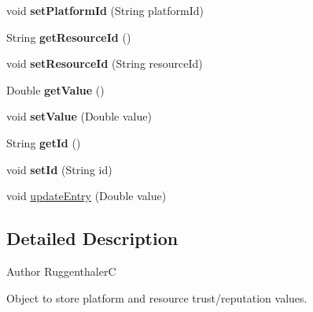 \begin{DoxyCompactItemize}
void {\bfseries set\+Platform\+Id} (String platform\+Id)
\item 
\mbox{\label{classeu_1_1h2020_1_1symbiote_1_1cloud_1_1trust_1_1model_1_1TrustEntry_a5f7be003bd8a5dc41841dd0511b74762}} 
String {\bfseries get\+Resource\+Id} ()
\item 
\mbox{\label{classeu_1_1h2020_1_1symbiote_1_1cloud_1_1trust_1_1model_1_1TrustEntry_a18bf70c0991b61a40bfc5a00c4338f4f}} 
void {\bfseries set\+Resource\+Id} (String resource\+Id)
\item 
\mbox{\label{classeu_1_1h2020_1_1symbiote_1_1cloud_1_1trust_1_1model_1_1TrustEntry_ab8b7dad13d671535776946afbfdae895}} 
Double {\bfseries get\+Value} ()
\item 
\mbox{\label{classeu_1_1h2020_1_1symbiote_1_1cloud_1_1trust_1_1model_1_1TrustEntry_ae66b1c3ffd502fe4c15a8182392f720d}} 
void {\bfseries set\+Value} (Double value)
\item 
\mbox{\label{classeu_1_1h2020_1_1symbiote_1_1cloud_1_1trust_1_1model_1_1TrustEntry_a7f41291f1f8f87e6bdf34122b1f5934d}} 
String {\bfseries get\+Id} ()
\item 
\mbox{\label{classeu_1_1h2020_1_1symbiote_1_1cloud_1_1trust_1_1model_1_1TrustEntry_afa37c6356321fddac5f941c3e633e54c}} 
void {\bfseries set\+Id} (String id)
\item 
void \hyperlink{classeu_1_1h2020_1_1symbiote_1_1cloud_1_1trust_1_1model_1_1TrustEntry_a85de3aba33fbe0d8e7599e54af80c66a}{update\+Entry} (Double value)
\end{DoxyCompactItemize}


\subsection{Detailed Description}
\begin{DoxyAuthor}{Author}
RuggenthalerC \begin{DoxyVerb}    Object to store platform and resource trust/reputation values.\end{DoxyVerb}
 
\end{DoxyAuthor}


